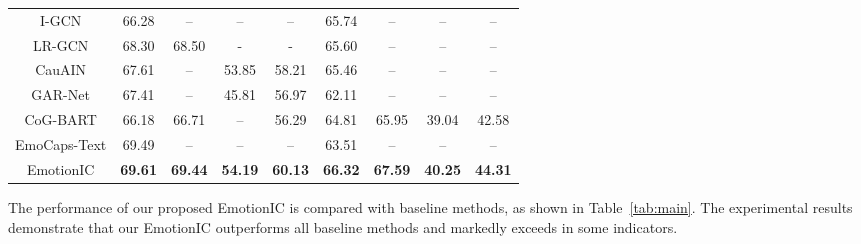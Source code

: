 \documentclass{SCIS2019}
\begin{document}
\begin{table}[htbp]
\begin{center}
\begin{tabular}{c|cc|cc|cc|cc}
I-GCN       &66.28 &-- &-- &-- &65.74 &-- &-- &--\\
LR-GCN       &68.30 &68.50 &- &- &65.60 &-- &-- &--\\
CauAIN      &67.61 &-- &53.85 &58.21 &65.46 &-- &-- &--\\

GAR-Net 	& 67.41 & -- 	& 45.81 	& 56.97 & 62.11 & --  	& -- & --\\
CoG-BART 	& 66.18 & 66.71 	& -- 	& 56.29 & 64.81 & 65.95  	& 39.04 & 42.58\\
EmoCaps-Text 	& 69.49 & -- 	& -- 	& -- & 63.51 & --  	& -- & --\\	
\hline
{EmotionIC} & \textbf{69.61} 	& \textbf{69.44} 	& \textbf{54.19} & \textbf{60.13} 	& \textbf{66.32}	& \textbf{67.59} & \textbf{40.25} 		& \textbf{44.31}\\								
\bottomrule
\end{tabular}
\end{center}
\end{table}
The performance of our proposed EmotionIC is compared with baseline methods, as shown in Table~\ref{tab:main}. The experimental results demonstrate that our EmotionIC outperforms all baseline methods and markedly exceeds in some indicators.
\end{document}
